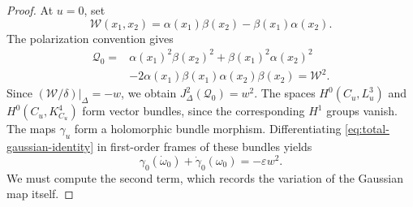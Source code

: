 \documentclass[10pt,a4paper]{amsart}
\begin{document}
\begin{proof}
At $u=0$, set
\[
\mathcal W(x_1,x_2)=
\alpha(x_1)\beta(x_2)-\beta(x_1)\alpha(x_2).
\]
The polarization convention gives
\begin{equation}
\label{q0w2}
\begin{aligned}
\mathcal Q_0
={}&\alpha(x_1)^2\beta(x_2)^2+\beta(x_1)^2\alpha(x_2)^2\\
&-2\alpha(x_1)\beta(x_1)\alpha(x_2)\beta(x_2)
=\mathcal W^2.
\end{aligned}
\end{equation}
Since $(\mathcal W/\delta)|_\Delta=-w$, we obtain
$J_\Delta^2(\mathcal Q_0)=w^2$. The spaces $H^0(C_u,L_u^3)$ and $H^0(C_u,K_{C_u}^4)$ form vector
bundles, since the corresponding $H^1$ groups vanish. The maps
$\gamma_u$ form a holomorphic bundle morphism. Differentiating
\eqref{eq:total-gaussian-identity} in first-order frames of these
bundles yields
\begin{equation}
\label{eq:total-gaussian-derivative}
\gamma_0(\dot\omega_0)+\dot\gamma_0(\omega_0)
=-\varepsilon w^2.
\end{equation}
We must compute the second term, which records the variation of the
Gaussian map itself.


\end{proof}
\end{document}
